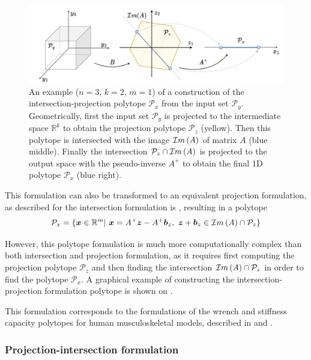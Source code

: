 \begin{figure}[!t]
    \centering
    \includegraphics[width=\linewidth]{Chapters/imgs/spec_int_proj.pdf}
    \caption{An example ($n=3$, $k=2$, $m=1$) of a construction of the intersection-projection polytope $\mathcal{P}_x$ from the input set $\mathcal{P}_y$. Geometrically, first the input set $\mathcal{P}_y$ is projected to the intermediate space $\mathbb{R}^k$ to obtain the projection polytope $\mathcal{P}_z$ (yellow). Then this polytope is intersected with the image $\mathcal{I}m\left(A\right)$ of matrix $A$ (blue middle). Finally the intersection $\mathcal{P}_z\cap\mathcal{I}m\left(A\right)$ is projected to the output space with the pseudo-inverse $A^+$ to obtain the final 1D polytope $\mathcal{P}_x$ (blue right).}
    \label{fig:inter_proj_spec}
\end{figure}
This formulation can also be transformed to an equivalent projection formulation, as described for the intersection formulation is , resulting in a polytope 
\begin{equation}
\mathcal{P}_x=\{\bm{x} \in \mathbb{R}^m |~ \bm{x} = A^+\bm{z} - A^+\bm{b}_z,~ \bm{z}+\bm{b}_z \in \mathcal{I}m\left(A\right)\cap\mathcal{P}_z\} 
\end{equation}

However, this polytope formulation is much more computationally complex than both intersection and projection formulation, as it requires first computing the projection polytope $\mathcal{P}_z$ and then finding the intersection $\mathcal{I}m\left(A\right)\cap\mathcal{P}_z$ in order to find the polytope $\mathcal{P}_x$. A graphical example of constructing the intersection-projection formulation polytope is shown on .


\begin{remark}
    This formulation corresponds to the formulations of the wrench and stiffness capacity polytopes for human musculoskeletal models, described in  and .
\end{remark}


\subsubsection{Projection-intersection formulation}
\label{ch:proj_inter_form}


